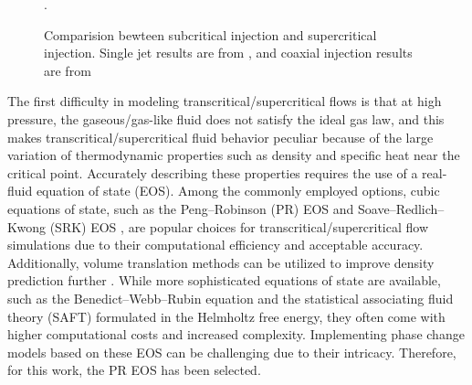 \begin{figure}[htb]
    \centering
    \caption{Comparision bewteen subcritical injection and supercritical injection. Single jet results are from \cite{chehroudi1999initial}, and coaxial injection results are from \cite{telaar2000experimental}} \label{Intro_trans_exp}. 
\end{figure}




The first difficulty in modeling transcritical/supercritical flows is that at high pressure, the gaseous/gas-like fluid does not satisfy the ideal gas law, and this makes transcritical/supercritical fluid behavior peculiar because of the large variation of thermodynamic properties such as density and specific heat near the critical point. Accurately describing these properties requires the use of a real-fluid equation of state (EOS). Among the commonly employed options, cubic equations of state, such as the Peng–Robinson (PR) EOS \cite{peng1976new} and Soave–Redlich–Kwong (SRK) EOS \cite{soave1972equilibrium}, are popular choices for transcritical/supercritical flow simulations due to their computational efficiency and acceptable accuracy. Additionally, volume translation methods can be utilized to improve density prediction further \cite{muller2016large}. While more sophisticated equations of state are available, such as the Benedict–Webb–Rubin equation \cite{benedict1940empirical} and the statistical associating fluid theory (SAFT) \cite{gross2001perturbed} formulated in the Helmholtz free energy, they often come with higher computational costs and increased complexity. Implementing phase change models based on these EOS can be challenging due to their intricacy. 
Therefore, for this work, the PR EOS has been selected.

